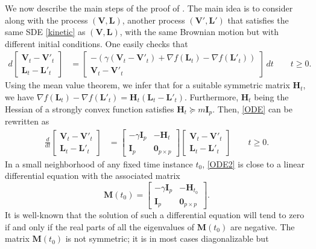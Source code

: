 \documentclass[a4paper,bej,preprint,reqno]{imsart}
\newcommand\bfH{\mathbf H}
\newcommand\bfM{\mathbf M}
\newcommand\bL{\boldsymbol L}
\newcommand\bV{\boldsymbol V}
\newcommand\bfI{\mathbf I}
\begin{document}
We now describe the main steps of the proof of .
The main idea is to consider along with the process $(\bV,\bL)$, another process
$(\bV',\bL')$ that satisfies the same SDE
\eqref{kinetic} as $(\bV,\bL)$, with the same Brownian motion but with
different initial conditions. One easily checks that
\begin{align}\label{ODE}
    d
		\begin{bmatrix}
		\bV_t-\bV'_t\\
		\bL_t-\bL'_t
		\end{bmatrix}
		&=
		\begin{bmatrix}
		-(\gamma (\bV_t-\bV'_t) + \nabla f(\bL_t)-\nabla f(\bL'_t))\\
		\bV_t-\bV'_t
		\end{bmatrix}
		\,dt\qquad t\ge 0.
\end{align}
Using the mean value theorem, we infer that for a suitable symmetric matrix
$\bfH_t$, we have $\nabla f(\bL_t)-\nabla f(\bL'_t) = \bfH_t(\bL_t-\bL'_t)$. Furthermore,
$\bfH_t$ being the Hessian of a strongly convex function satisfies $\bfH_t\succeq m\bfI_p$.
Then, \eqref{ODE} can be rewritten as
\begin{align}\label{ODE2}
    \frac{d}{dt}
		\begin{bmatrix}
		\bV_t-\bV'_t\\
		\bL_t-\bL'_t
		\end{bmatrix}
		&=
		\begin{bmatrix}
		-\gamma\bfI_p  & -\bfH_t \\
		\bfI_p & \mathbf 0_{p\times p}
		\end{bmatrix}
				\begin{bmatrix}
		\bV_t-\bV'_t\\
		\bL_t-\bL'_t
		\end{bmatrix}
		\qquad t\ge 0.
\end{align}
In a small neighborhood of any fixed time instance $t_0$, \eqref{ODE2} is close to a
linear differential equation with the associated matrix
$$
\bfM(t_0) = 		\begin{bmatrix}
		-\gamma\bfI_p  & -\bfH_{t_0} \\
		\bfI_p & \mathbf 0_{p\times p}
		\end{bmatrix}.
$$
It is well-known that the solution of such a differential equation will tend to zero
if and only if the real parts of all the eigenvalues of $\bfM(t_0)$ are negative.
The matrix $\bfM(t_0)$ is not symmetric; it is in most cases diagonalizable but
\end{document}
